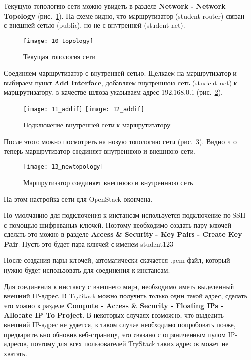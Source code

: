 Текущую топологию сети можно увидеть в разделе \textbf{Network - Network Topology} (рис.~\ref{pic:topology}).
На схеме видно, что маршрутизатор (student-router) связан с внешней сетью (public), но не с внутренней (student-net).
\begin{figure}[ht]
    \centering
    \texttt{[image: 10\_topology]}
    \caption{Текущая топология сети}\label{pic:topology}
\end{figure}

Соединяем маршрутизатор с внутренней сетью.
Щелкаем на маршрутизатор и выбираем пункт \textbf{Add Interface}, добавляем внутреннюю сеть (student-net) к маршрутизатору, в качестве шлюза указываем адрес 192.168.0.1 (рис.~\ref{pic:addif}).
\begin{figure}[ht]
    \centering
    \texttt{[image: 11\_addif]}
    \texttt{[image: 12\_addif]}
    \caption{Подключение внутренней сети к маршрутизатору}\label{pic:addif}
\end{figure}

После этого можно посмотреть на новую топологию сети (рис.~\ref{pic:new_topology}).
Видно что теперь маршрутизатор соединяет внутреннюю и внешнюю сети.
\begin{figure}[ht]
    \centering
    \texttt{[image: 13\_newtopology]}
    \caption{Маршрутизатор соединяет внешнюю и внутреннюю сеть}\label{pic:new_topology}
\end{figure}

На этом настройка сети для OpenStack окончена.

\clearpage

По умолчанию для подключения к инстансам используется подключение по SSH с помощью шифрованых ключей.
Поэтому необходимо создать пару ключей, сделать это можно в разделе \textbf{Access \& Security - Key Pairs - Create Key Pair}.
Пусть это будет пара ключей с именем student123.

После создания пары ключей, автоматически скачается .pem файл, который нужно будет использовать для соединения к инстансам.

Для соединения к инстансу с внешнего мира, необходимо иметь выделенный внешний IP-адрес.
В TryStack можно получить только один такой адрес, сделать это можно в разделе \textbf{Compute - Access \& Security - Floating IPs - Allocate IP To Project}.
В некоторых случаях возможно, что выделить внешний IP-адрес не удается, в таком случае необходимо попробовать позже, предварительно обновив веб-страницу, это связано с ограниченным пулом IP-адресов, поэтому для всех пользователей TryStack таких адресов может не хватать.

